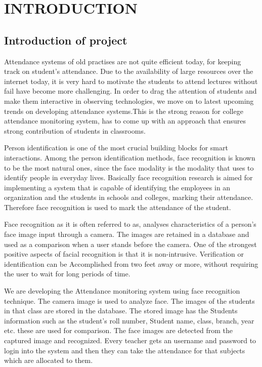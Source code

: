 
\chapter{INTRODUCTION}
\section{Introduction of project }

Attendance systems of old practises are not quite efficient today, for keeping track on student’s attendance. Due to the availability of large resources over the internet today, it is very hard to motivate the students to attend lectures without fail have become more challenging. In order to drag the attention of students and make them interactive in observing technologies, we move on to latest upcoming trends on developing attendance systems.\cite{sups}This is the strong reason for college attendance monitoring system, has to come up with an approach that ensures strong contribution of students in classrooms.

Person identification is one of the most crucial building blocks for smart interactions. Among the person identification methods, face recognition is known to be the most natural ones, since the face modality is the modality that uses to identify people in everyday lives. Basically face recognition research is aimed for implementing a system that is capable of identifying the employees in an organization and the students in schools and colleges, marking their attendance. Therefore face recognition is used to mark the attendance of the student. \cite{manju}

Face recognition as it is often referred to as, analyses characteristics of a person's face image input through a camera. The images are retained in a database and used as a comparison when a user stands before the camera. One of the strongest positive aspects of facial recognition is that it is non-intrusive. Verification or identification can be Accomplished from two feet away or more, without requiring the user to wait for long periods of time.\cite{sups}

We are developing the Attendance monitoring system using face recognition technique. The camera image is used to analyze face. The images of the students in that class are stored in the database. The stored image has the Students information such as the student’s roll number, Student name, class, branch, year etc. these are used for comparison. The face images are detected from the captured image and recognized. Every teacher gets an username and password to login into the system and then they can take the attendance for that subjects which are allocated to them.\cite{priti}

